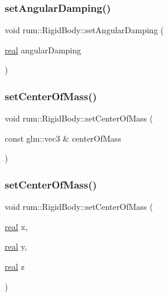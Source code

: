 \mbox{\label{classrum_1_1_rigid_body_a5eb02440283b3dc6ebd7e2afbf769614}} 
\subsubsection{\texorpdfstring{set\+Angular\+Damping()}{setAngularDamping()}}
{\footnotesize\ttfamily void rum\+::\+Rigid\+Body\+::set\+Angular\+Damping (\begin{DoxyParamCaption}\item[{\mbox{\hyperlink{namespacerum_a7e8cca23573d5eaead0f138cbaa4862c}{real}}}]{angular\+Damping }\end{DoxyParamCaption})}

\mbox{\label{classrum_1_1_rigid_body_acca155dcca1bcd56fde11a4cc23c9dea}} 
\subsubsection{\texorpdfstring{set\+Center\+Of\+Mass()}{setCenterOfMass()}\hspace{0.1cm}{\footnotesize\ttfamily [1/2]}}
{\footnotesize\ttfamily void rum\+::\+Rigid\+Body\+::set\+Center\+Of\+Mass (\begin{DoxyParamCaption}\item[{const glm\+::vec3 \&}]{center\+Of\+Mass }\end{DoxyParamCaption})}

\mbox{\label{classrum_1_1_rigid_body_a983c67327b420e87c1c9f8d1fd29d68d}} 
\subsubsection{\texorpdfstring{set\+Center\+Of\+Mass()}{setCenterOfMass()}\hspace{0.1cm}{\footnotesize\ttfamily [2/2]}}
{\footnotesize\ttfamily void rum\+::\+Rigid\+Body\+::set\+Center\+Of\+Mass (\begin{DoxyParamCaption}\item[{\mbox{\hyperlink{namespacerum_a7e8cca23573d5eaead0f138cbaa4862c}{real}}}]{x,  }\item[{\mbox{\hyperlink{namespacerum_a7e8cca23573d5eaead0f138cbaa4862c}{real}}}]{y,  }\item[{\mbox{\hyperlink{namespacerum_a7e8cca23573d5eaead0f138cbaa4862c}{real}}}]{z }\end{DoxyParamCaption})}

